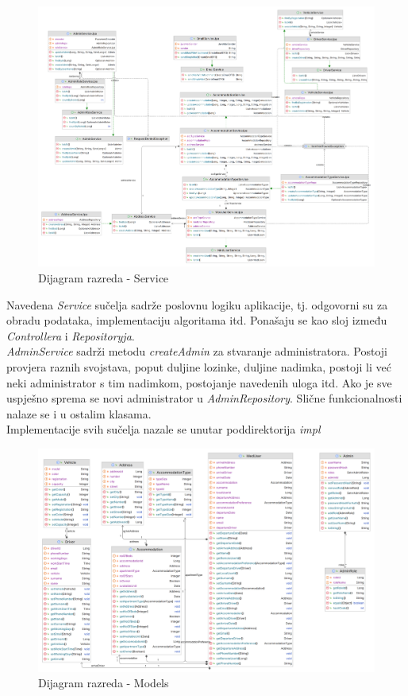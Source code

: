 			\begin{figure}[H]
				\includegraphics[width=\textwidth]{slike/service.PNG}
				\caption{Dijagram razreda - Service}
				\label{serviceDiagram}
			\end{figure}
			
			{Navedena \textit{Service} sučelja sadrže poslovnu logiku aplikacije, tj. odgovorni su za obradu podataka, implementaciju algoritama itd. Ponašaju se kao sloj između \textit{Controllera} i \textit{Repositoryja}.\\
			\textit{AdminService} sadrži metodu \textit{createAdmin} za stvaranje administratora. Postoji provjera raznih svojstava, poput duljine lozinke, duljine nadimka, postoji li već neki administrator s tim nadimkom, postojanje navedenih uloga itd. Ako je sve uspješno sprema se novi administrator u \textit{AdminRepository}. Slične funkcionalnosti nalaze se i u ostalim klasama.\\
			Implementacije svih sučelja nazale se unutar poddirektorija \textit{impl}}\\
			
			\begin{figure}[H]
				\includegraphics[width=\textwidth]{slike/domain.PNG}
				\caption{Dijagram razreda - Models}
				\label{domainDiagram}
			\end{figure}
			
